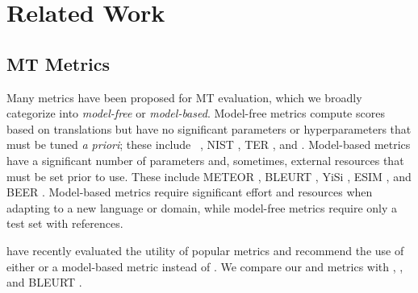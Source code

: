 \section{Related Work}

\subsection{MT Metrics}
 Many metrics have been proposed for MT evaluation, which we broadly categorize into \textit{model-free} or \textit{model-based}. Model-free metrics compute scores based on translations but have no significant parameters or hyperparameters that must be tuned \textit{a priori}; these include  \bleu\ \cite{papineni-etal-2002-bleu}, NIST \cite{doddington2002-nist}, TER \cite{snover2006TER}, and  \cite{popovic-2015-chrf}.  Model-based metrics have a significant number of parameters and, sometimes, external resources that must be set prior to use. These include METEOR \cite{banerjee-lavie-2005-meteor},  BLEURT \cite{sellam-etal-2020-bleurt}, YiSi \cite{lo-2019-yisi}, ESIM \cite{mathur-etal-2019-ESIM}, and BEER \cite{stanojevic-simaan-2014-beer}. Model-based metrics require significant effort and resources when adapting to a new language or domain, while model-free metrics require only a test set with references. 

\citet{mathur-etal-2020-tangled} have recently evaluated the utility of popular metrics and recommend the use of either  or a model-based metric instead of \bleu. 
We compare our  and  metrics with \bleu, , and BLEURT \cite{sellam-etal-2020-bleurt}.


